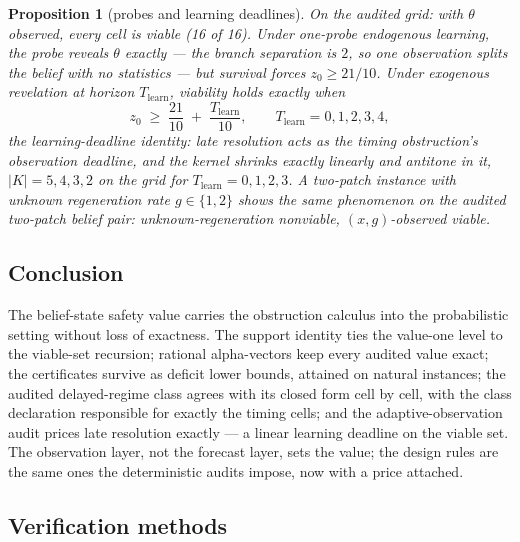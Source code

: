 \documentclass[10pt,twocolumn]{article}
\theoremstyle{plain}
\newtheorem{proposition}[theorem]{Proposition}
\theoremstyle{definition}
\theoremstyle{remark}
\begin{document}
\begin{proposition}[probes and learning deadlines]\label{prop:learn}
On the audited grid: with \(\theta\) observed, every cell is viable
(16 of 16). Under one-probe endogenous learning, the probe reveals
\(\theta\) exactly --- the branch separation is \(2\), so one
observation splits the belief with no statistics --- but survival
forces \(z_{0} \ge 21/10\). Under exogenous revelation at horizon
\(T_{\mathrm{learn}}\), viability holds exactly when
\[
z_{0} \;\ge\; \frac{21}{10} \;+\; \frac{T_{\mathrm{learn}}}{10},
\qquad T_{\mathrm{learn}} = 0, 1, 2, 3, 4,
\]
the learning-deadline identity: late resolution acts as the timing
obstruction's observation deadline, and the kernel shrinks exactly
linearly and antitone in it, \(|K| = 5, 4, 3, 2\) on the grid for
\(T_{\mathrm{learn}} = 0, 1, 2, 3\). A two-patch instance with unknown
regeneration rate \(g \in \{1, 2\}\) shows the same phenomenon on the
audited two-patch belief pair: unknown-regeneration nonviable,
\((x, g)\)-observed viable.
\end{proposition}

\subsection{Conclusion}\label{conclusion}

The belief-state safety value carries the obstruction calculus into the
probabilistic setting without loss of exactness. The support identity
ties the value-one level to the viable-set recursion; rational
alpha-vectors keep every audited value exact; the certificates survive
as deficit lower bounds, attained on natural instances; the audited
delayed-regime class agrees with its closed form cell by cell, with the
class declaration responsible for exactly the timing cells; and the
adaptive-observation audit prices late resolution exactly --- a linear
learning deadline on the viable set. The observation layer, not the
forecast layer, sets the value; the design rules are the same ones the
deterministic audits impose, now with a price attached.

\subsection{Verification methods}\label{methods}
\end{document}
